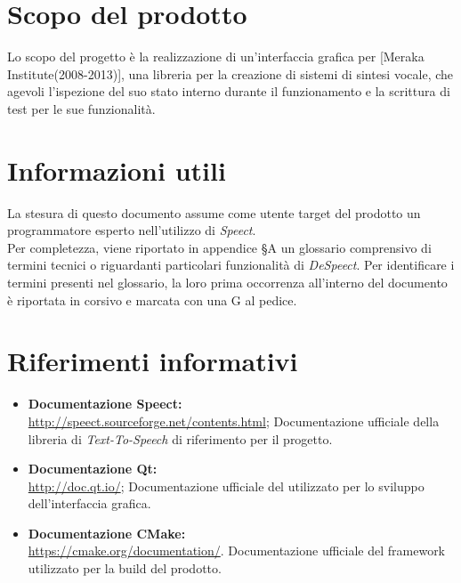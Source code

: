 \documentclass[openany,12pt,a4paper]{report}
\begin{document}
	\section{Scopo del prodotto}
	
	Lo scopo del progetto è la realizzazione di un’interfaccia grafica per  [Meraka Institute(2008-2013)], una libreria per la creazione di sistemi di sintesi vocale, che agevoli l’ispezione del suo stato interno durante il funzionamento e la scrittura di test per le sue funzionalità.
	
	\section{Informazioni utili}
	
	La stesura di questo documento assume come utente target del prodotto un programmatore esperto nell'utilizzo di \textit{Speect}. \\
	\noindent Per completezza, viene riportato in appendice §A un glossario comprensivo di termini tecnici o riguardanti particolari funzionalità di \textit{DeSpeect}. Per identificare i termini presenti nel glossario, la loro prima occorrenza all’interno del documento è riportata in corsivo e marcata con una G al pedice. 
	

	
	\section{Riferimenti informativi}

	\begin{itemize}
		\item \textbf{Documentazione Speect:} \\
		\url{http://speect.sourceforge.net/contents.html};
		\subitem Documentazione ufficiale della libreria di \textit{Text-To-Speech} di riferimento per il progetto.
		
		\item \textbf{Documentazione Qt:} \\
		\url{http://doc.qt.io/};
		\subitem Documentazione ufficiale del  utilizzato per lo sviluppo dell'interfaccia grafica.
		
		\item \textbf{Documentazione CMake:} \\
		\url{https://cmake.org/documentation/}.
		\subitem Documentazione ufficiale del framework utilizzato per la build del prodotto. 
	\end{itemize}
\end{document}
